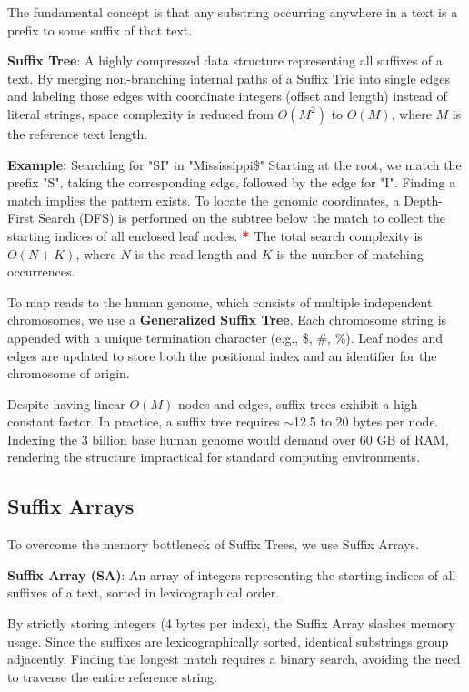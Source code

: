 \documentclass{article}
\newcommand{\sta}{\textbf{\textcolor{red}{* }}}
\begin{document}
The fundamental concept is that any substring occurring anywhere in a text is a prefix to some suffix of that text.

\begin{important}
    \textbf{Suffix Tree}: A highly compressed data structure representing all suffixes of a text. By merging non-branching internal paths of a Suffix Trie into single edges and labeling those edges with coordinate integers (offset and length) instead of literal strings, space complexity is reduced from $O(M^2)$ to $O(M)$, where $M$ is the reference text length.
\end{important}

\textbf{Example:} Searching for "SI" in "Mississippi\$"
Starting at the root, we match the prefix "S", taking the corresponding edge, followed by the edge for "I". Finding a match implies the pattern exists. To locate the genomic coordinates, a Depth-First Search (DFS) is performed on the subtree below the match to collect the starting indices of all enclosed leaf nodes.
\sta The total search complexity is $O(N + K)$, where $N$ is the read length and $K$ is the number of matching occurrences.

To map reads to the human genome, which consists of multiple independent chromosomes, we use a \textbf{Generalized Suffix Tree}. Each chromosome string is appended with a unique termination character (e.g., \$, \#, \%). Leaf nodes and edges are updated to store both the positional index and an identifier for the chromosome of origin.

Despite having linear $O(M)$ nodes and edges, suffix trees exhibit a high constant factor. In practice, a suffix tree requires $\sim$12.5 to 20 bytes per node. Indexing the 3 billion base human genome would demand over 60 GB of RAM, rendering the structure impractical for standard computing environments.

\subsection{Suffix Arrays}

To overcome the memory bottleneck of Suffix Trees, we use Suffix Arrays.

\begin{important}
    \textbf{Suffix Array (SA)}: An array of integers representing the starting indices of all suffixes of a text, sorted in lexicographical order. 
\end{important}

By strictly storing integers (4 bytes per index), the Suffix Array slashes memory usage. Since the suffixes are lexicographically sorted, identical substrings group adjacently. Finding the longest match requires a binary search, avoiding the need to traverse the entire reference string. 
\end{document}
